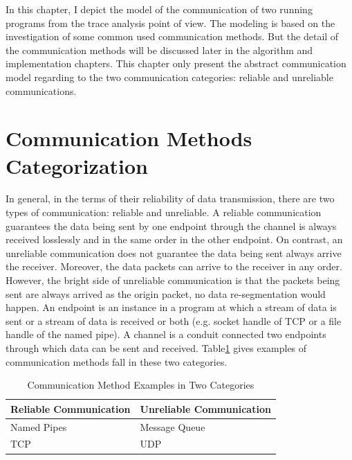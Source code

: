 
\label{chapter:mod}
In this chapter, I depict the model of the communication of two running programs from the trace analysis point of view. The modeling is based on the investigation of some common used communication methods. But the detail of the communication methods will be discussed later in the algorithm and implementation chapters. This chapter only present the abstract communication model regarding to the two communication categories: reliable and unreliable communications. 

\section{Communication Methods Categorization}
In general,  in the terms of their reliability of data transmission, there are two types of communication: reliable and unreliable. A reliable communication guarantees the data being sent by one endpoint through the channel is always received losslessly and in the same order in the other endpoint. On contrast, an unreliable communication does not guarantee the data being sent always arrive the receiver. Moreover, the data packets can arrive to the receiver in any order. However, the bright side of unreliable communication is that the packets being sent are always arrived as the origin packet, no data re-segmentation would happen. An endpoint is an instance in a program at which a stream of data is sent or a stream of data is received or both (e.g. socket handle of TCP or a file handle of the named pipe). A channel is a conduit connected two endpoints through  which data can be sent and received. Table\ref{methodsInCategories} gives examples of communication methods fall in these two categories.
\begin{table}[H]
\centering
\caption{Communication Method Examples in Two Categories}
\label{methodsInCategories}
\begin{tabular}{|l|l|}
 \hline
\textbf{Reliable Communication}& \textbf{Unreliable Communication}\\
 \hline
Named Pipes & Message Queue   \\
TCP &  UDP \\
 \hline
\end{tabular}
\end{table}


